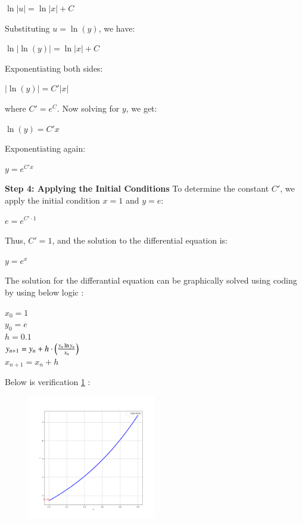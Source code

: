 \documentclass[journal]{IEEEtran}
\begin{document}
\begin{center}
$ \ln|u| = \ln|x| + C $
\end{center}

Substituting $ u = \ln(y) $, we have:

\begin{center}
$ \ln|\ln(y)| = \ln|x| + C $
\end{center}

Exponentiating both sides:

\begin{center}
$ |\ln(y)| = C' |x| $
\end{center}

where $ C' = e^C $. Now solving for $ y $, we get:

\begin{center}
$ \ln(y) = C' x $
\end{center}

Exponentiating again:

\begin{center}
$ y = e^{C' x} $
\end{center}

\textbf{Step 4: Applying the Initial Conditions}
To determine the constant $ C' $, we apply the initial condition $ x = 1 $ and $ y = e $:

\begin{center}
$ e = e^{C' \cdot 1} $
\end{center}

Thus, $ C' = 1 $, and the solution to the differential equation is:

\begin{center}
$ y = e^x $
\end{center}


The solution for the differantial equation can be graphically solved using coding by using below logic :

\begin{center} 
$x_0 = 1 $ \\
$y_0 = e $ \\
$ h=0.1 $ \\
$y_{n+1} = y_{n} + h\cdot\left(\frac{y_{n}\ln{y_{n}}}{x_{n}}\right)$ \\
$x_{n+1} = x_{n} + h$ \\
\end{center}

Below is verification \ref{fig:example} :
\begin{figure}[h]  %
    \centering  %
    \includegraphics[width=0.5\textwidth]{fig/Figure_1.png}  %
      \label{fig:example}  %
\end{figure}
\end{document}

